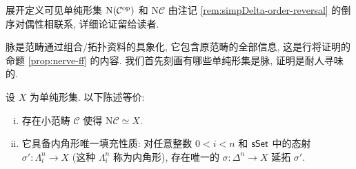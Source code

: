 \begin{remark}
	展开定义可见单纯形集 $\mathrm{N}(\mathcal{C}^{\operatorname{op}})$ 和 $\mathrm{N}\mathcal{C}$ 由注记 \ref{rem:simpDelta-order-reversal} 的倒序对偶性相联系, 详细论证留给读者.
\end{remark}

脉是范畴通过组合/拓扑资料的具象化, 它包含原范畴的全部信息, 这是行将证明的命题 \ref{prop:nerve-ff} 的内容. 我们首先刻画有哪些单纯形集是脉, 证明是耐人寻味的.

\begin{proposition}[脉的刻画]\label{prop:inner-horn-filling}
	设 $X$ 为单纯形集. 以下陈述等价:
	\begin{enumerate}[(i)]
		\item 存在小范畴 $\mathcal{C}$ 使得 $\mathrm{N}\mathcal{C} \simeq X$.
		\item 它具备内角形唯一填充性质: 对任意整数 $0 < i < n$ 和 $\mathsf{sSet}$ 中的态射 $\sigma': \Lambda^n_i \to X$ (这种 $\Lambda^n_i$ 称为内角形), 存在唯一的 $\sigma: \Delta^n \to X$ 延拓 $\sigma'$.
	\end{enumerate}
\end{proposition}
